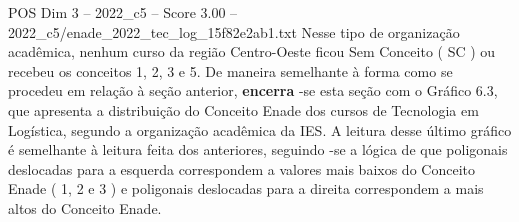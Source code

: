 \begin{textsample}{POS Dim 3 – 2022\_c5 – Score 3.00 – 2022\_c5/enade\_2022\_tec\_log\_15f82e2ab1.txt}
Nesse tipo de organização acadêmica, nenhum curso da região Centro-Oeste ficou Sem Conceito ( SC ) ou recebeu os conceitos 1, 2, 3 e 5.
De maneira semelhante à forma como se procedeu em relação à seção anterior, \textbf{encerra} -se esta seção com o Gráfico 6.3, que apresenta a distribuição do Conceito Enade dos cursos de Tecnologia em Logística, segundo a organização acadêmica da IES.
A leitura desse último gráfico é semelhante à leitura feita dos anteriores, seguindo -se a lógica de que poligonais deslocadas para a esquerda correspondem a valores mais baixos do Conceito Enade ( 1, 2 e 3 ) e poligonais deslocadas para a direita correspondem a mais altos do Conceito Enade.

\end{textsample}
